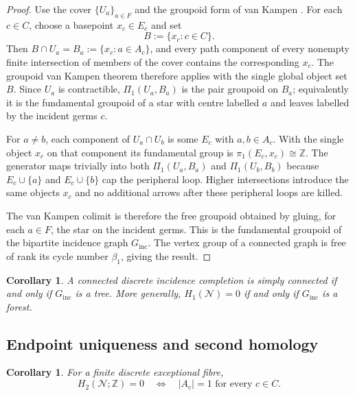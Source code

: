 \documentclass[11pt]{article}
\theoremstyle{plain}
\newtheorem{corollary}[theorem]{Corollary}
\theoremstyle{definition}
\begin{document}
\begin{proof}
Use the cover $\{U_a\}_{a\in F}$ and the groupoid form of van Kampen
\citep{Brown2006}.  For each $c\in C$, choose a basepoint $x_c\in E_c$ and set
\[
B:=\{x_c:c\in C\}.
\]
Then $B\cap U_a=B_a:=\{x_c:a\in A_c\}$, and every path component of every
nonempty finite intersection of members of the cover contains the corresponding
$x_c$.  The groupoid van Kampen theorem therefore applies with the single global
object set $B$.  Since $U_a$ is contractible, $\Pi_1(U_a,B_a)$ is the pair groupoid
on $B_a$; equivalently it is the fundamental groupoid of a star with centre labelled
$a$ and leaves labelled by the incident germs $c$.

For $a\neq b$, each component of $U_a\cap U_b$ is some $E_c$ with
$a,b\in A_c$.  With the single object $x_c$ on that component its fundamental group is
$\pi_1(E_c,x_c)\cong\mathbb Z$.  The generator maps trivially into both
$\Pi_1(U_a,B_a)$ and $\Pi_1(U_b,B_b)$ because $E_c\cup\{a\}$ and
$E_c\cup\{b\}$ cap the peripheral loop.  Higher intersections introduce the same
objects $x_c$ and no additional arrows after these peripheral loops are killed.

The van Kampen colimit is therefore the free groupoid obtained by gluing, for each
$a\in F$, the star on the incident germs.  This is the fundamental groupoid of the
bipartite incidence graph $G_{\mathrm{inc}}$.  The vertex group of a connected graph is
free of rank its cycle number $\beta_1$, giving the result.
\end{proof}

\begin{corollary}
\label{cor:incidence-simply-connected}
A connected discrete incidence completion is simply connected if and only if
$G_{\mathrm{inc}}$ is a tree.  More generally, $H_1(\mathcal N)=0$ if and only if
$G_{\mathrm{inc}}$ is a forest.
\end{corollary}

\subsection{Endpoint uniqueness and second homology}
\label{subsec:H2-unique-endpoints}


\begin{corollary}
\label{cor:H2-unique-completion}
For a finite discrete exceptional fibre,
\[
H_2(\mathcal N;\mathbb Z)=0
\quad\Longleftrightarrow\quad
|A_c|=1
\text{ for every }c\in C.
\]
\end{corollary}
\end{document}
